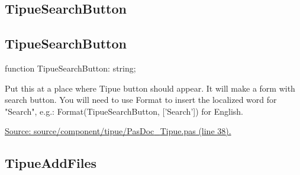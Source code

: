 \documentclass{report}
\newif\ifpdf
\begin{document}
\subsection*{\large{\textbf{TipueSearchButton}}\normalsize\hspace{1ex}\hrulefill}
\else
\subsection*{TipueSearchButton}
\fi
\label{PasDoc_Tipue-TipueSearchButton}
\begin{list}{}{
\setlength{\itemindent}{0cm}
\setlength{\listparindent}{0cm}
\setlength{\leftmargin}{\evensidemargin}
\addtolength{\leftmargin}{\tmplength}
\settowidth{\labelsep}{X}
\addtolength{\leftmargin}{\labelsep}
\setlength{\labelwidth}{\tmplength}
}
\item[\textbf{Declaration}\hfill]
\ifpdf
\begin{flushleft}
\fi
\begin{ttfamily}
function TipueSearchButton: string;\end{ttfamily}

\ifpdf
\end{flushleft}
\fi

\par
\item[\textbf{Description}]
Put this at a place where Tipue button should appear. It will make a form with search button. You will need to use Format to insert the localized word for "Search", e.g.: Format(TipueSearchButton, ['Search']) for English.\par
\href{https://github.com/pasdoc/pasdoc/blob/master/source/component/tipue/PasDoc_Tipue.pas#L38}{Source: source/component/tipue/PasDoc{\_}Tipue.pas (line 38).}

\end{list}
\ifpdf
\subsection*{\large{\textbf{TipueAddFiles}}\normalsize\hspace{1ex}\hrulefill}
\else
\end{document}
